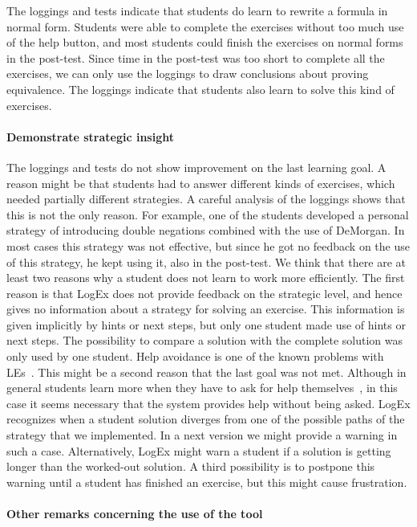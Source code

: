 \documentclass[a4paper,UKenglish]{lipics}
\begin{document}
The loggings and tests indicate that students do learn to rewrite a formula in
normal form. Students were able to complete the exercises without too much use of
the help button, and most students could finish the exercises on normal forms in
the post-test. Since time in the post-test was too short to complete all the
exercises, we can only use the loggings to draw conclusions about
proving equivalence. The loggings indicate that students also learn to solve this kind
of exercises.

\paragraph*{Demonstrate strategic insight}  

The loggings and tests do not show improvement on the last learning goal. 
A reason might be that students had to answer different kinds of exercises, which 
needed partially different strategies. A careful analysis of the loggings shows 
that this is not the only reason.  For example, one of the students
developed a personal strategy of introducing double negations combined with the
use of DeMorgan. In most cases this strategy was not effective, but since he got
no feedback on the use of this strategy, he kept using it, also in the post-test.
We think that there are at least two reasons why a student does not learn to
work more efficiently. The first reason is that LogEx does not provide feedback
on the strategic level, and hence gives no information about a strategy for
solving an exercise. This information is given implicitly by hints or next
steps, but only one student made use of hints or next steps. The possibility to
compare a solution with the complete solution was only used by one student.
Help avoidance is one of the known problems with
LEs~\cite{Vaessen,Vanlehn:2006,aleven03}. This might be a second reason that the
last goal was not met. Although in general students learn more when they have to
ask for help themselves~\cite{Vanlehn:2006}, in this case it seems necessary
that the system provides help without being asked. LogEx recognizes when a
student solution diverges from one of the possible paths of the strategy that we
implemented. In a next version we might provide a warning in such a case.
Alternatively, LogEx might warn a student if a solution is getting longer than
the worked-out solution. A third possibility is to postpone this warning until a
student has finished an exercise, but this might cause frustration.

\paragraph*{Other remarks concerning the use of the tool}
\end{document}
